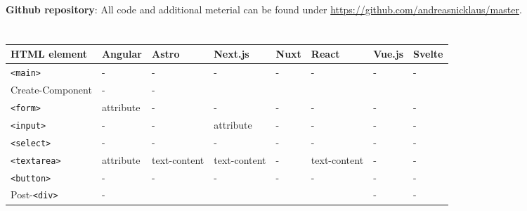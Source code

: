 \documentclass[a4paper, 12pt]{article}
\makeatletter
\renewcommand\listoftables{%
  \section{\listtablename}%
  \@mkboth{\MakeUppercase\listtablename}{\MakeUppercase\listtablename}%
  \@starttoc{lot}%
}
\makeatother
\begin{document}
\pagebreak

\nocite{*}
{}

\vfill
\textbf{Github repository}: All code and additional meterial can be found under \url{https://github.com/andreasnicklaus/master}.

\pagebreak

\listoftables

\begin{table}[!ht]
  \centering
  \begin{adjustbox}{angle=90}
    \begin{tabular}{|l|l|l|l|l|l|l|l|}
      \hline
      \textbf{HTML element}           & \textbf{Angular}  & \textbf{Astro}  & \textbf{Next.js}  & \textbf{Nuxt} & \textbf{React}  & \textbf{Vue.js} & \textbf{Svelte} \\ \hline
      \verb|<main>|                   & -                 & -               & -                 & -             & -               & -               & -               \\ \hline
      Create-Component                & -                 & -               & ~                 & ~             & ~               & ~               & ~               \\ \hline
      \verb|<form>|                   & attribute         & -               & -                 & -             & -               & -               & -               \\ \hline
      \verb|<input>|                  & -                 & -               & attribute         & -             & -               & -               & -               \\ \hline
      \verb|<select>|                 & -                 & -               & -                 & -             & -               & -               & -               \\ \hline
      \verb|<textarea>|               & attribute         & text-content    & text-content      & -             & text-content    & -               & -               \\ \hline
      \verb|<button>|                 & -                 & -               & -                 & -             & -               & -               & -               \\ \hline
      Post-\verb|<div>|               & -                 & ~               & ~                 & ~             & ~               & -               & -               \\ \hline

\end{tabular}
\end{adjustbox}
\end{table}
\end{document}
